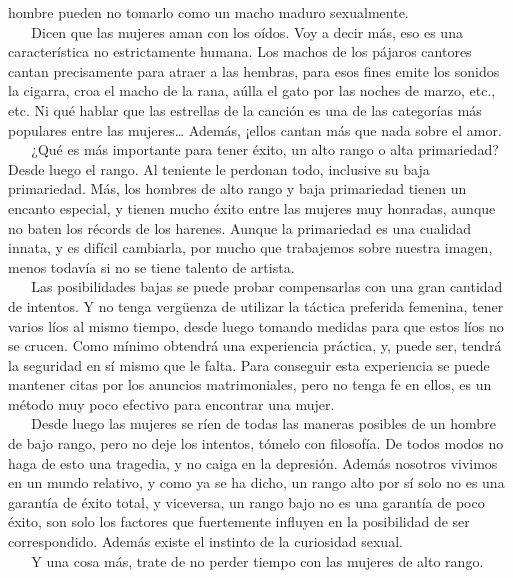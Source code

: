 hombre pueden no tomarlo como un macho maduro sexualmente.\\
\hspace*{0.333em} ~ ~ Dicen que las mujeres aman con los oídos. Voy a
decir más, eso es una característica no estrictamente humana. Los machos
de los pájaros cantores cantan precisamente para atraer a las hembras,
para esos fines emite los sonidos la cigarra, croa el macho de la rana,
aúlla el gato por las noches de marzo, etc., etc. Ni qué hablar que las
estrellas de la canción es una de las categorías más populares entre las
mujeres\ldots{} Además, ¡ellos cantan más que nada sobre el amor.\\
\hspace*{0.333em} ~ ~ ¿Qué es más importante para tener éxito, un alto
rango o alta primariedad? Desde luego el rango. Al teniente le perdonan
todo, inclusive su baja primariedad. Más, los hombres de alto rango y
baja primariedad tienen un encanto especial, y tienen mucho éxito entre
las mujeres muy honradas, aunque no baten los récords de los harenes.
Aunque la primariedad es una cualidad innata, y es difícil cambiarla,
por mucho que trabajemos sobre nuestra imagen, menos todavía si no se
tiene talento de artista.\\
\hspace*{0.333em} ~ ~ Las posibilidades bajas se puede probar
compensarlas con una gran cantidad de intentos. Y no tenga vergüenza de
utilizar la táctica preferida femenina, tener varios líos al mismo
tiempo, desde luego tomando medidas para que estos líos no se crucen.
Como mínimo obtendrá una experiencia práctica, y, puede ser, tendrá la
seguridad en sí mismo que le falta. Para conseguir esta experiencia se
puede mantener citas por los anuncios matrimoniales, pero no tenga fe en
ellos, es un método muy poco efectivo para encontrar una mujer.\\
\hspace*{0.333em} ~ ~ Desde luego las mujeres se ríen de todas las
maneras posibles de un hombre de bajo rango, pero no deje los intentos,
tómelo con filosofía. De todos modos no haga de esto una tragedia, y no
caiga en la depresión. Además nosotros vivimos en un mundo relativo, y
como ya se ha dicho, un rango alto por sí solo no es una garantía de
éxito total, y viceversa, un rango bajo no es una garantía de poco
éxito, son solo los factores que fuertemente influyen en la posibilidad
de ser correspondido. Además existe el instinto de la curiosidad
sexual.\\
\hspace*{0.333em} ~ ~ Y una cosa más, trate de no perder tiempo con las
mujeres de alto rango.


